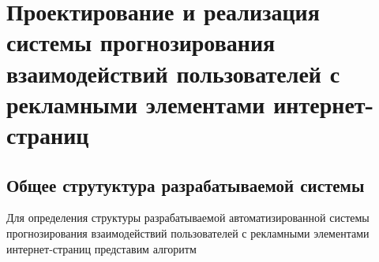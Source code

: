 \section{Проектирование и реализация системы прогнозирования взаимодействий пользователей с рекламными элементами интернет-страниц}
\subsection{Общее струтуктура разрабатываемой системы}

Для определения структуры разрабатываемой автоматизированной системы прогнозирования взаимодействий пользователей
с рекламными элементами интернет-страниц представим алгоритм
